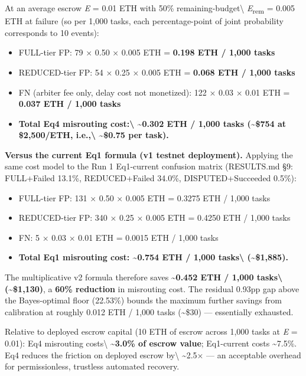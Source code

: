 \documentclass[
  10pt,
]{article}
\providecommand{\tightlist}{%
  \setlength{\itemsep}{0pt}\setlength{\parskip}{0pt}}
\begin{document}
At an average escrow \emph{E} = 0.01 ETH with 50\%
remaining-budget\textbackslash{} \emph{E}\textsubscript{rem} = 0.005 ETH
at failure (so per 1,000 tasks, each percentage-point of joint
probability corresponds to 10 events):

\begin{itemize}
\tightlist
\item
  FULL-tier FP: 79 × 0.50 × 0.005 ETH = \textbf{0.198 ETH / 1,000 tasks}
\item
  REDUCED-tier FP: 54 × 0.25 × 0.005 ETH = \textbf{0.068 ETH / 1,000
  tasks}
\item
  FN (arbiter fee only, delay cost not monetized): 122 × 0.03 × 0.01 ETH
  = \textbf{0.037 ETH / 1,000 tasks}
\item
  \textbf{Total Eq4 misrouting cost:\textbackslash{}
  \textasciitilde0.302 ETH / 1,000 tasks (\textasciitilde\$754 at
  \$2,500/ETH, i.e.,\textbackslash{} \textasciitilde\$0.75 per task).}
\end{itemize}

\textbf{Versus the current Eq1 formula (v1 testnet deployment).}
Applying the same cost model to the Run 1 Eq1-current confusion matrix
(RESULTS.md §9: FULL+Failed 13.1\%, REDUCED+Failed 34.0\%,
DISPUTED+Succeeded 0.5\%):

\begin{itemize}
\tightlist
\item
  FULL-tier FP: 131 × 0.50 × 0.005 ETH = 0.3275 ETH / 1,000 tasks
\item
  REDUCED-tier FP: 340 × 0.25 × 0.005 ETH = 0.4250 ETH / 1,000 tasks
\item
  FN: 5 × 0.03 × 0.01 ETH = 0.0015 ETH / 1,000 tasks
\item
  \textbf{Total Eq1 misrouting cost: \textasciitilde0.754 ETH / 1,000
  tasks\textbackslash{} (\textasciitilde\$1,885).}
\end{itemize}

The multiplicative v2 formula therefore saves
\textbf{\textasciitilde0.452 ETH / 1,000 tasks\textbackslash{}
(\textasciitilde\$1,130)}, a \textbf{60\% reduction} in misrouting cost.
The residual 0.93pp gap above the Bayes-optimal floor (22.53\%) bounds
the maximum further savings from calibration at roughly 0.012 ETH /
1,000 tasks (\textasciitilde\$30) --- essentially exhausted.

Relative to deployed escrow capital (10 ETH of escrow across 1,000 tasks
at \emph{E} = 0.01): Eq4 misrouting costs\textbackslash{}
\textbf{\textasciitilde3.0\% of escrow value}; Eq1-current costs
\textasciitilde7.5\%. Eq4 reduces the friction on deployed escrow
by\textbackslash{} \textasciitilde2.5× --- an acceptable overhead for
permissionless, trustless automated recovery.
\end{document}
